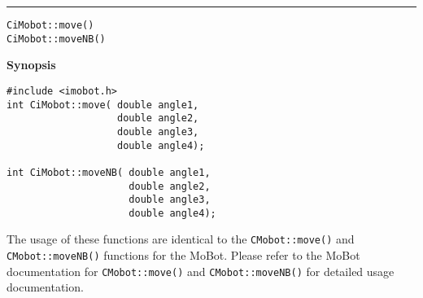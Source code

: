 \noindent
\vspace{5pt}
\rule{6.5in}{0.015in}
\noindent
{\LARGE \texttt{CiMobot::move()}}\\
{\LARGE \texttt{CiMobot::moveNB()}}\\
{}

\noindent
{\bf Synopsis}\\
\begin{verbatim}
#include <imobot.h>
int CiMobot::move( double angle1, 
                   double angle2, 
                   double angle3, 
                   double angle4);

int CiMobot::moveNB( double angle1, 
                     double angle2, 
                     double angle3, 
                     double angle4);
\end{verbatim}

The usage of these functions are identical to the
\texttt{CMobot::move()} and \texttt{CMobot::moveNB()} functions for the MoBot.
Please refer to the MoBot documentation for \texttt{CMobot::move()} and
\texttt{CMobot::moveNB()} for
detailed usage documentation.

